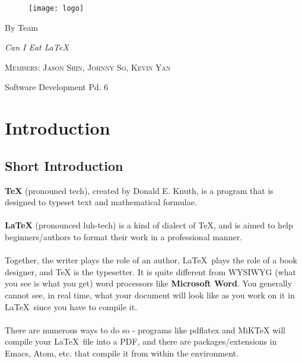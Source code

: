 \documentclass[a4paper,11pt]{report}
\begin{document}
\begin{titlepage}
	\begin{figure}[!ht]
		\centering
			\texttt{[image: logo]}
	\end{figure}
	\vspace{3cm}
	\centering
	{\huge By Team \par}
	\vspace{0.5cm}
	{\huge\itshape Can I Eat LaTeX \par}
	\vspace{2cm}
	{\scshape\Large  Members: Jason Shin, Johnny So, Kevin Yan\par}
	{\large Software Development Pd. 6}
\end{titlepage}
	
\newpage
\tableofcontents


\newpage
\chapter{Introduction}
\section{Short Introduction}
\Large
\textbf{\TeX} (pronouned tech), created by Donald E. Knuth, is a program that is
designed to typeset text and mathematical formulae. \\\\
\textbf{\LaTeX} (pronounced luh-tech) is a kind of dialect of TeX, and is aimed to help beginners/authors to
format their work in a professional manner. \\\\
Together, the writer plays the role of an author, \LaTeX\ plays the role of a book designer, and TeX is the
typesetter. It is quite different from WYSIWYG (what you see is what you get)
word processors like \textbf{Microsoft Word}. You generally cannot see, in real
time, what your document will look like as you work on it in \LaTeX\ since you
have to compile it. \\\\
There are numerous ways to do so - programs like pdflatex and MiKTeX will
compile your \LaTeX\ file into a PDF, and there are packages/extensions in Emacs, Atom, etc. that compile it from within the environment.
\end{document}
